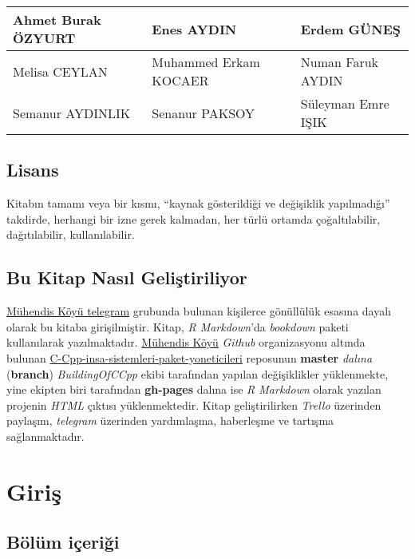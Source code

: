 \documentclass[
]{book}
\begin{document}
\begin{tabular}{l|l|l}
\hline
Ahmet Burak ÖZYURT & Enes AYDIN & Erdem GÜNEŞ\\
\hline
Melisa CEYLAN & Muhammed Erkam KOCAER & Numan Faruk AYDIN\\
\hline
Semanur AYDINLIK & Senanur PAKSOY & Süleyman Emre IŞIK\\
\hline
\end{tabular}

\hypertarget{lisans}{%
\section*{Lisans}\label{lisans}}

Kitabın tamamı veya bir kısmı, ``kaynak gösterildiği ve değişiklik yapılmadığı'' takdirde, herhangi bir izne gerek kalmadan, her türlü ortamda çoğaltılabilir, dağıtılabilir, kullanılabilir.

\hypertarget{bu-kitap-nasux131l-geliux15ftiriliyor}{%
\section*{Bu Kitap Nasıl Geliştiriliyor}\label{bu-kitap-nasux131l-geliux15ftiriliyor}}

\href{https://t.me/koyumuhendis}{Mühendis Köyü telegram} grubunda bulunan kişilerce gönüllülük esasına dayalı olarak bu kitaba girişilmiştir. Kitap, \emph{R Markdown}'da \emph{bookdown} paketi kullanılarak yazılmaktadır. \href{https://github.com/MuhendisKoyu}{Mühendis Köyü} \emph{Github} organizasyonu altında bulunan \href{https://github.com/MuhendisKoyu/C-Cpp-insa-sistemleri-paket-yoneticileri}{C-Cpp-insa-sistemleri-paket-yoneticileri} reposunun \textbf{master} \emph{dalına} (\textbf{branch}) \emph{BuildingOfCCpp} ekibi tarafından yapılan değişiklikler yüklenmekte, yine ekipten biri tarafından \textbf{gh-pages} dalına ise \emph{R Markdown} olarak yazılan projenin \emph{HTML} çıktısı yüklenmektedir. Kitap geliştirilirken \emph{Trello} üzerinden paylaşım, \emph{telegram} üzerinden yardımlaşma, haberleşme ve tartışma sağlanmaktadır.

\hypertarget{giriux15f}{%
\chapter*{Giriş}\label{giriux15f}}

\hypertarget{buxf6luxfcm-iuxe7eriux11fi}{%
\section*{Bölüm içeriği}\label{buxf6luxfcm-iuxe7eriux11fi}}
\end{document}
